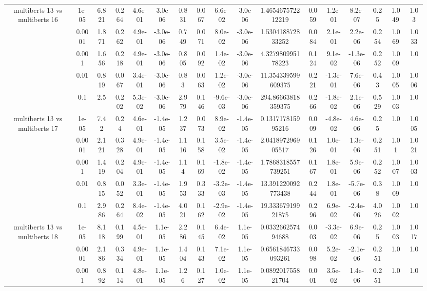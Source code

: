 \begin{tabular}{|c|c|c|c|c|c|c|c|c|c|c|c|c|c|c|c|c|}
\hline
\multirow{5}{*}{multiberts 13 vs multiberts 16} & 1e-05 & 6.821 & 0.264 & 4.6e-01 & -3.0e-06 & 0.831 & 0.067 & 6.6e-02 & -3.0e-06 & 1.465467572212219 & 0.059 & 1.2e-01 & 8.2e-07 & 0.25 & 1.049 & 1.03 \\
 & 0.0001 & 1.871 & 0.262 & 4.9e-01 & -3.0e-06 & 0.749 & 0.071 & 8.0e-02 & -3.0e-06 & 1.530418872833252 & 0.084 & 2.1e-01 & 2.2e-06 & 0.254 & 1.069 & 1.033 \\
 & 0.001 & 1.656 & 0.218 & 4.9e-01 & -3.0e-06 & 0.805 & 0.092 & 1.4e-02 & -3.0e-06 & 4.327980995178223 & 0.124 & 9.1e-02 & -1.3e-06 & 0.252 & 1.009 & 1.0 \\
 & 0.01 & 0.819 & 0.067 & 3.4e-01 & -3.0e-06 & 0.83 & 0.063 & 1.2e-02 & -3.0e-06 & 11.354339599609375 & 0.221 & -1.3e-01 & 7.6e-06 & 0.43 & 1.005 & 1.006 \\
 & 0.1 & 2.5 & 0.202 & 5.3e-02 & -3.0e-06 & 2.979 & 0.146 & -9.6e-03 & -3.0e-06 & 294.86663818359375 & 0.266 & -1.8e-02 & 2.1e-06 & 0.529 & 1.003 & 1.0 \\
\hline
\multirow{5}{*}{multiberts 13 vs multiberts 17} & 1e-05 & 7.42 & 0.24 & 4.6e-01 & -1.4e-05 & 1.237 & 0.073 & 8.9e-02 & -1.4e-05 & 0.131717815995216 & 0.009 & -4.8e-02 & 4.6e-06 & 0.25 & 1.0 & 1.005 \\
 & 0.0001 & 2.121 & 0.328 & 4.9e-01 & -1.4e-05 & 1.116 & 0.158 & 3.5e-02 & -1.4e-05 & 2.041897296905517 & 0.126 & 1.0e-01 & 1.3e-06 & 0.251 & 1.01 & 1.021 \\
 & 0.001 & 1.419 & 0.204 & 4.9e-01 & -1.4e-05 & 1.14 & 0.169 & -1.8e-02 & -1.4e-05 & 1.7868318557739251 & 0.167 & 1.8e-01 & 5.9e-06 & 0.252 & 1.007 & 1.003 \\
 & 0.01 & 0.815 & 0.052 & 3.3e-01 & -1.4e-05 & 1.953 & 0.333 & -3.2e-03 & -1.4e-05 & 13.391220092773438 & 0.244 & 1.8e-01 & -5.7e-06 & 0.38 & 1.009 & 1.0 \\
 & 0.1 & 2.986 & 0.264 & 8.4e-02 & -1.4e-05 & 4.021 & 0.162 & -2.9e-02 & -1.4e-05 & 19.33367919921875 & 0.296 & 6.9e-02 & -2.4e-06 & 4.026 & 1.002 & 1.0 \\
\hline
\multirow{5}{*}{multiberts 13 vs multiberts 18} & 1e-05 & 8.118 & 0.199 & 4.5e-01 & 1.1e-05 & 2.286 & 0.145 & 6.4e-02 & 1.1e-05 & 0.033266257494688 & 0.003 & -3.3e-02 & 6.9e-06 & 0.25 & 1.003 & 1.017 \\
 & 0.0001 & 2.186 & 0.334 & 4.9e-01 & 1.1e-05 & 1.404 & 0.143 & 7.1e-02 & 1.1e-05 & 0.6561846733093261 & 0.098 & 5.2e-02 & -2.1e-06 & 0.251 & 1.0 & 1.0 \\
 & 0.001 & 0.892 & 0.114 & 4.8e-01 & 1.1e-05 & 1.26 & 0.127 & 1.0e-02 & 1.1e-05 & 0.089201755821704 & 0.001 & 3.5e-02 & 1.4e-06 & 0.251 & 1.0 & 1.0 \\

\end{tabular}

